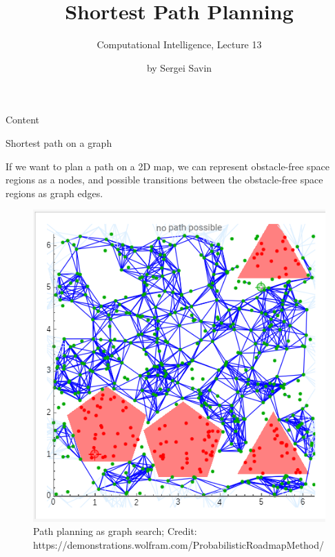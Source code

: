\documentclass{beamer}
\title{Shortest Path Planning}
\subtitle{Computational Intelligence, Lecture 13}
\author{by Sergei Savin}
\date{\mydate}
\begin{document}
\maketitle


\begin{frame}{Content}


\end{frame}



\begin{frame}{Shortest path on a graph}
	\begin{flushleft}
		
		If we want to plan a path on a 2D map, we can represent obstacle-free space regions as a nodes, and possible transitions between the obstacle-free space regions as graph edges. 
		
		\begin{figure}
			\centering
			\includegraphics[width=0.4\linewidth]{GraphPathPlanning}
			\caption{Path planning as graph search; \scriptsize{Credit: https://demonstrations.wolfram.com/ProbabilisticRoadmapMethod/}}
			\label{fig:graphpathplanning}
		\end{figure}
		
		
	\end{flushleft}
\end{frame}
\end{document}
